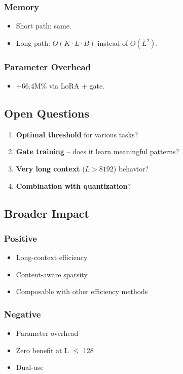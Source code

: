 \subsubsection{Memory}
\begin{itemize}
\item Short path: same.
\item Long path: $O(K \cdot L \cdot B)$ instead of $O(L^2)$.

\end{itemize}
\subsubsection{Parameter Overhead}
\begin{itemize}
\item +66.4M\% via LoRA + gate.

\end{itemize}
\subsection{Open Questions}

\begin{enumerate}
\item \textbf{Optimal threshold} for various tasks?
\item \textbf{Gate training} -- does it learn meaningful patterns?
\item \textbf{Very long context} ($L > 8192$) behavior?
\item \textbf{Combination with quantization}?

\end{enumerate}
\subsection{Broader Impact}

\subsubsection{Positive}
\begin{itemize}
\item Long-context efficiency
\item Content-aware sparsity
\item Composable with other efficiency methods

\end{itemize}
\subsubsection{Negative}
\begin{itemize}
\item Parameter overhead
\item Zero benefit at L $\le$ 128
\item Dual-use

\end{itemize}

